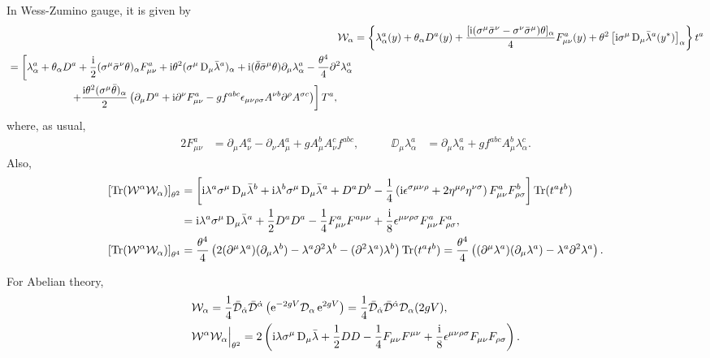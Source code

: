 \documentclass[CheatSheet]{subfiles}
\newcommand{\OD}{{\mathcal D}}
\begin{document}
In Wess-Zumino gauge, it is given by
\begin{align}
\mathcal W_\alpha &=\left\{
\lambda_{\alpha}^{a}(y)+\theta_\alpha D^{a}(y)+\frac{[\mathrm{i}(\sigma^{\mu}\bar\sigma^{\nu}-\sigma^{\nu}\bar\sigma^{\mu})\theta]_\alpha}{4} F^a_{\mu\nu}(y)
+\theta^2 \left[\mathrm{i}\sigma^{\mu}\mathop{}\!\mathrm{D}_\mu\bar{\lambda}^a(y^*)\right]_\alpha
\right\}t^a
\\\begin{split}&=\left[
\lambda_{\alpha}^{a}+\theta_\alpha D^{a}+\frac{\mathrm{i}}{2} (\sigma^{\mu}\bar\sigma^{\nu}\theta)_\alpha F^a_{\mu\nu}
+\mathrm{i} \theta^2(\sigma^{\mu}\mathop{}\!\mathrm{D}_{\mu}\bar{\lambda}^{a})_\alpha
+\mathrm{i}(\bar\theta\bar\sigma^{\mu}\theta)\partial_{\mu}\lambda _{\alpha}^{a}
-\frac{\theta^4}{4} \partial^2\lambda _{\alpha}^{a}
\right.\\&\qquad\qquad\qquad\left.
+\frac{\mathrm{i}\theta^2(\sigma^{\mu}\bar\theta)_{\alpha}}{2} \left(\partial_{\mu}D^{a}
+\mathrm{i}\partial^\nu F^a_{\mu\nu}
- gf^{abc}\epsilon_{\mu\nu \rho\sigma}  A^{\nu b}\partial^{\rho}A^{\sigma c}
\right)\right]T^{a},
\end{split}
\end{align}
where, as usual,
\begin{alignat}{2}
F^a_{\mu\nu}&=\partial_{\mu}A_\nu^a-\partial_{\nu}A_\mu^a+g A_\mu^b A_\nu^c f^{abc},
&\qquad
\DD_\mu\lambda^a_\alpha
&=\partial_{\mu}\lambda^{a}_\alpha+g f^{abc}A_\mu^{b}\lambda^{c}_\alpha.
\end{alignat}
Also,
\begin{align}
 \left[\operatorname{\mathrm{Tr}}(\mathcal W^\alpha\mathcal W_\alpha)\right]_{\theta^2}
&=
\left[
\mathrm{i}\lambda^a\sigma^{\mu}\mathop{}\!\mathrm{D}_{\mu}\bar{\lambda}^{b}
+\mathrm{i}\lambda^b\sigma^{\mu}\mathop{}\!\mathrm{D}_{\mu}\bar{\lambda}^{a}
+D^a D^{b}
-\frac{1}{4}\left(\mathrm{i} \epsilon^{\sigma\mu \nu\rho}+2\eta^{\mu\rho}\eta^{\nu\sigma}\right)
F^a_{\mu\nu}F^b_{\rho\sigma}
\right]
\operatorname{\mathrm{Tr}}(t^at^b)
\\
&=
\mathrm{i}\lambda^a\sigma^{\mu}\mathop{}\!\mathrm{D}_{\mu}\bar{\lambda}^a
+\frac12D^a D^a
-\frac14F^a_{\mu\nu}F^{a\mu\nu}
+\frac{\mathrm{i}}{8}\epsilon^{\mu \nu\rho\sigma}
F^a_{\mu\nu}F^a_{\rho\sigma},
\\
 \left[\operatorname{\mathrm{Tr}}(\mathcal W^\alpha\mathcal W_\alpha)\right]_{\theta^4}
&=
\frac{\theta^4}{4} \left(2 (\partial^{\mu}\lambda^{a})(\partial_{\mu}\lambda^{b})-\lambda^{a}\partial^2\lambda^{b}-(\partial^2\lambda^{a})\lambda^b\right)\operatorname{\mathrm{Tr}}(t^at^b)
=
\frac{\theta^4}{4} \left((\partial^{\mu}\lambda^{a})(\partial_{\mu}\lambda^{a})-\lambda^{a}\partial^2\lambda^{a}\right).
\end{align}

For Abelian theory,
\begin{align}
& \mathcal W_\alpha = \frac14\bar\OD_\dalpha\bar\OD^\dalpha\left(\ee^{-2gV}\OD_\alpha\ee^{2gV}\right)
=\frac14\bar\OD_\dalpha\bar\OD^\dalpha\OD_\alpha(2gV),
\\
& \mathcal W^\alpha\mathcal W_\alpha\Big|_{\theta^2}
=2\left(
\ii\lambda\sigma^{\mu}\DD_{\mu}\bar{\lambda}
+\frac12DD
-\frac14F_{\mu\nu}F^{\mu\nu}
+\frac{\ii}{8}\epsilon^{\mu \nu\rho\sigma}
F_{\mu\nu}F_{\rho\sigma}\right).
\end{align}
\end{document}
